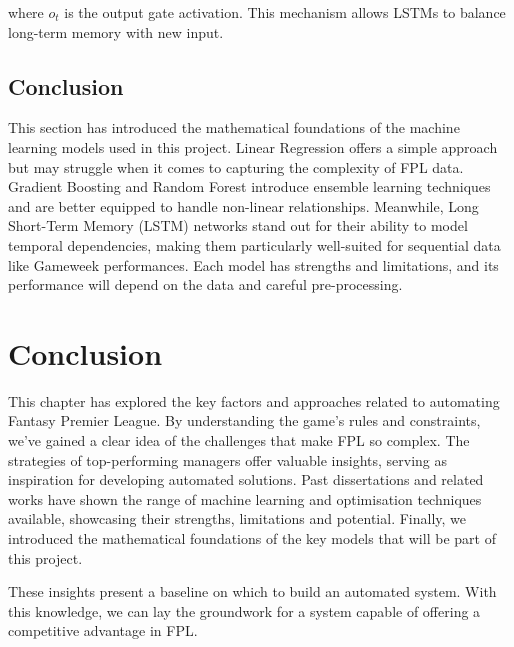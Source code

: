 where \( o_t \) is the output gate activation. This mechanism allows LSTMs to balance long-term memory with new input.

\subsection{Conclusion}

This section has introduced the mathematical foundations of the machine learning models used in this project. Linear Regression offers a simple approach but may struggle when it comes to capturing the complexity of FPL data. Gradient Boosting and Random Forest introduce ensemble learning techniques and are better equipped to handle non-linear relationships. Meanwhile, Long Short-Term Memory (LSTM) networks stand out for their ability to model temporal dependencies, making them particularly well-suited for sequential data like Gameweek performances. Each model has strengths and limitations, and its performance will depend on the data and careful pre-processing.

\section{Conclusion}

This chapter has explored the key factors and approaches related to automating Fantasy Premier League. By understanding the game’s rules and constraints, we’ve gained a clear idea of the challenges that make FPL so complex. The strategies of top-performing managers offer valuable insights, serving as inspiration for developing automated solutions. Past dissertations and related works have shown the range of machine learning and optimisation techniques available, showcasing their strengths, limitations and potential. Finally, we introduced the mathematical foundations of the key models that will be part of this project.

These insights present a baseline on which to build an automated system. With this knowledge, we can lay the groundwork for a system capable of offering a competitive advantage in FPL.